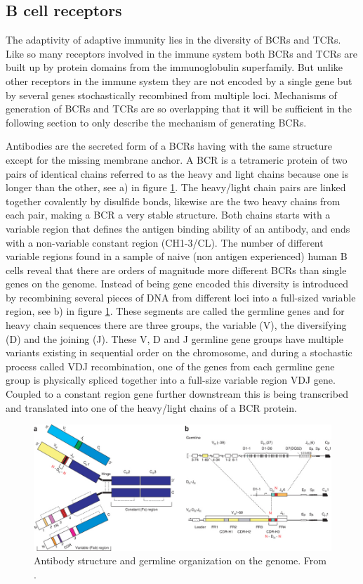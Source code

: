\subsection{B cell receptors}
The adaptivity of adaptive immunity lies in the diversity of BCRs and TCRs.
Like so many receptors involved in the immune system both BCRs and TCRs are built up by protein domains from the immunoglobulin superfamily.
But unlike other receptors in the immune system they are not encoded by a single gene but by several genes stochastically recombined from multiple loci.
Mechanisms of generation of BCRs and TCRs are so overlapping that it will be sufficient in the following section to only describe the mechanism of generating BCRs.

Antibodies are the secreted form of a BCRs having with the same structure except for the missing membrane anchor.
A BCR is a tetrameric protein of two pairs of identical chains referred to as the heavy and light chains because one is longer than the other, see a) in figure \ref{fig:BCR_structure2}.
The heavy/light chain pairs are linked together covalently by disulfide bonds, likewise are the two heavy chains from each pair, making a BCR a very stable structure.
Both chains starts with a variable region that defines the antigen binding ability of an antibody, and ends with a non-variable constant region (CH1-3/CL).
The number of different variable regions found in a sample of naive (non antigen experienced) human B cells reveal that there are orders of magnitude more different BCRs than single genes on the genome.
Instead of being gene encoded this diversity is introduced by recombining several pieces of DNA from different loci into a full-sized variable region, see b) in figure \ref{fig:BCR_structure2}.
These segments are called the germline genes and for heavy chain sequences there are three groups, the variable (V), the diversifying (D) and the joining (J).
These V, D and J germline gene groups have multiple variants existing in sequential order on the chromosome, and during a stochastic process called VDJ recombination, one of the genes from each germline gene group is physically spliced together into a full-size variable region VDJ gene.
Coupled to a constant region gene further downstream this is being transcribed and translated into one of the heavy/light chains of a BCR protein.

\begin{figure}
    \centering
    \includegraphics[width=1\textwidth]{figures/ab_structure.jpg}
    \caption{
        \label{fig:BCR_structure2}
        Antibody structure and germline organization on the genome.
        From \cite{georgiou2014promise}.
    }
\end{figure}


